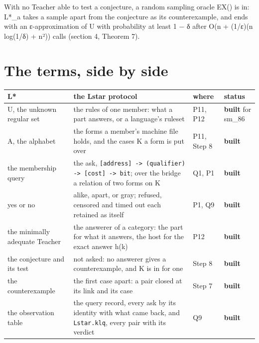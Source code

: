 With no Teacher able to test a conjecture, a random sampling oracle EX() is in: L*\_\allowbreak{}a takes a sample apart from the conjecture as its counterexample, and ends with an ε-approximation of U with probability at least 1 − δ after O(n + (1/ε)(n log(1/δ) + n²)) calls (section 4, Theorem 7).

\section{\texorpdfstring{The terms, side by side}{The terms, side by side}}

{\footnotesize
\setlength{\tabcolsep}{6pt}
\begin{longtable}{>{\RaggedRight\arraybackslash}p{}>{\RaggedRight\arraybackslash}p{}>{\RaggedRight\arraybackslash}p{}>{\RaggedRight\arraybackslash}p{}}
\toprule
L* & the Lstar protocol & where & status \\
\midrule
\endhead
U, the unknown regular set & the rules of one member: what a part answers, or a language's ruleset & P11, P12 & \textbf{built} for sm\_\allowbreak{}86 \\
A, the alphabet & the forms a member's machine file holds, and the cases K a form is put over & P11, Step 8 & \textbf{built} \\
the membership query & the ask, \texttt{[address] -\allowbreak{}> (qualifier) -\allowbreak{}> [cost] -\allowbreak{}> bit}; over the bridge a relation of two forms on K & Q1, P1 & \textbf{built} \\
yes or no & alike, apart, or gray; refused, censored and timed out each retained as itself & P1, Q9 & \textbf{built} \\
the minimally adequate Teacher & the answerer of a category: the part for what it answers, the host for the exact answer h(k) & P12 & \textbf{built} \\
the conjecture and its test & not asked: no answerer gives a counterexample, and K is in for one & Step 8 & \textbf{built} \\
the counterexample & the first case apart: a pair closed at its link and its case & Step 7 & \textbf{built} \\
the observation table & the query record, every ask by its identity with what came back, and \texttt{Lstar.\allowbreak{}klq}, every pair with its verdict & Q9 & \textbf{built} \\

\end{longtable}}
